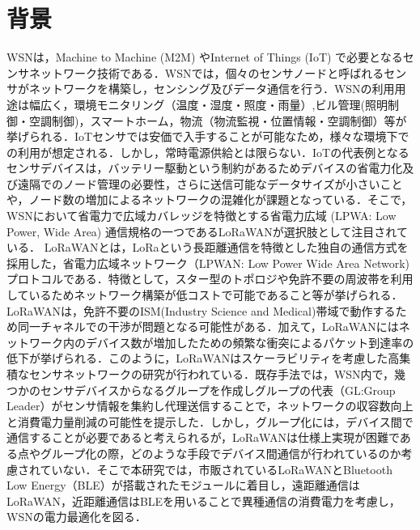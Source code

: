 \section{背景}
WSNは，Machine to Machine (M2M) やInternet of Things (IoT) で必要となるセンサネットワーク技術である．WSNでは，個々のセンサノードと呼ばれるセンサがネットワークを構築し，センシング及びデータ通信を行う．WSNの利用用途は幅広く，環境モニタリング（温度・湿度・照度・雨量）,ビル管理(照明制御・空調制御)，スマートホーム，物流（物流監視・位置情報・空調制御）等が挙げられる\cite{Farooq2018}．IoTセンサでは安価で入手することが可能なため，様々な環境下での利用が想定される．しかし，常時電源供給とは限らない．IoTの代表例となるセンサデバイスは，バッテリー駆動という制約があるためデバイスの省電力化及び遠隔でのノード管理の必要性，さらに送信可能なデータサイズが小さいことや，ノード数の増加によるネットワークの混雑化が課題となっている．そこで，WSNにおいて省電力で広域カバレッジを特徴とする省電力広域 (LPWA: Low Power, Wide Area) 通信規格の一つであるLoRaWANが選択肢として注目されている．
LoRaWANとは，LoRaという長距離通信を特徴とした独自の通信方式を採用した，省電力広域ネットワーク（LPWAN: Low Power Wide Area Network) プロトコルである．特徴として，スター型のトポロジや免許不要の周波帯を利用しているためネットワーク構築が低コストで可能であること等が挙げられる．LoRaWANは，免許不要のISM(Industry Science and Medical)帯域で動作するため同一チャネルでの干渉が問題となる可能性がある\cite{Adelantado2017}．加えて，LoRaWANにはネットワーク内のデバイス数が増加したための頻繁な衝突によるパケット到達率の低下が挙げられる．このように，LoRaWANはスケーラビリティを考慮した高集積なセンサネットワークの研究が行われている．既存手法では，WSN内で，幾つかのセンサデバイスからなるグループを作成しグループの代表（GL:Group Leader）がセンサ情報を集約し代理送信することで，ネットワークの収容数向上と消費電力量削減の可能性を提示した．しかし，グループ化には，デバイス間で通信することが必要であると考えられるが，LoRaWANは仕様上実現が困難である点やグループ化の際，どのような手段でデバイス間通信が行われているのか考慮されていない．そこで本研究では，市販されているLoRaWANとBluetooth Low Energy（BLE）が搭載されたモジュールに着目し，遠距離通信はLoRaWAN，近距離通信はBLEを用いることで異種通信の消費電力を考慮し，WSNの電力最適化を図る．
